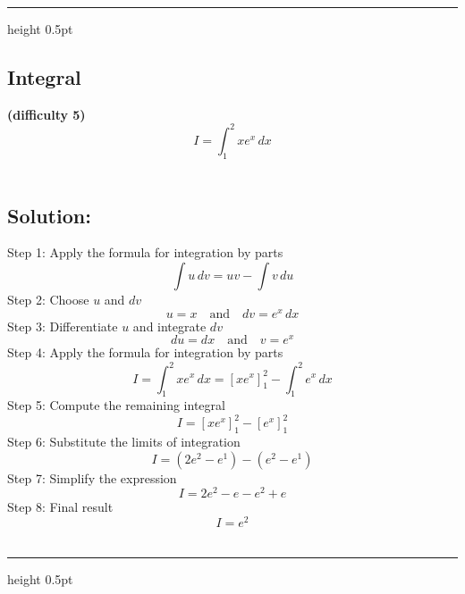 \documentclass{article}
\renewcommand{\rule}[2]{\leavevmode\leaders\hrule height #2 \hfill \kern 0pt}
\begin{document}
\begin{itemize}
  \begin{center}\rule{0.5\linewidth}{0.5pt}\end{center}

  \subsection{Integral}\label{integral-8}

  \textbf{(difficulty 5)}\\
  \[
  I = \int_1^2 x e^x \, dx
  \]\\

  \subsection{Solution:}\label{solution-8}

  \hfill\break
  Step 1: Apply the formula for integration by parts \[
  \int u \, dv = uv - \int v \, du
  \] Step 2: Choose \(u\) and \(dv\) \[
  u = x \quad \text{and} \quad dv = e^x \, dx
  \] Step 3: Differentiate \(u\) and integrate \(dv\) \[
  du = dx \quad \text{and} \quad v = e^x
  \] Step 4: Apply the formula for integration by parts \[
  I = \int_1^2 x e^x \, dx = \left[ x e^x \right]_1^2 - \int_1^2 e^x \, dx
  \] Step 5: Compute the remaining integral \[
  I = \left[ x e^x \right]_1^2 - \left[ e^x \right]_1^2
  \] Step 6: Substitute the limits of integration \[
  I = \left( 2e^2 - e^1 \right) - \left( e^2 - e^1 \right)
  \] Step 7: Simplify the expression \[
  I = 2e^2 - e - e^2 + e
  \] Step 8: Final result \[
  I = e^2
  \]\\

  \begin{center}\rule{0.5\linewidth}{0.5pt}\end{center}
\end{itemize}
\end{document}
